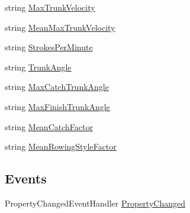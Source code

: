 \begin{DoxyCompactItemize}
string \hyperlink{class_rowing_monitor_1_1_view_model_1_1_rowing_meta_data_view_model_a4a77b8f455bb2f7862d2a7b8317be240}{Max\+Trunk\+Velocity}
\item 
string \hyperlink{class_rowing_monitor_1_1_view_model_1_1_rowing_meta_data_view_model_ac3f9c7d2915d82a2dd52a5d2cde6bdf6}{Mean\+Max\+Trunk\+Velocity}
\item 
string \hyperlink{class_rowing_monitor_1_1_view_model_1_1_rowing_meta_data_view_model_a96c4ef2c2ec7317e1df269ea3bfb124a}{Strokes\+Per\+Minute}
\item 
string \hyperlink{class_rowing_monitor_1_1_view_model_1_1_rowing_meta_data_view_model_a90dbffdd98c1a1415d9d8b41d65684f2}{Trunk\+Angle}
\item 
string \hyperlink{class_rowing_monitor_1_1_view_model_1_1_rowing_meta_data_view_model_abaecd5e8f7ff65231b2ba9b8390baecb}{Max\+Catch\+Trunk\+Angle}
\item 
string \hyperlink{class_rowing_monitor_1_1_view_model_1_1_rowing_meta_data_view_model_a9ae268c1bb8e81d38974f8e81977682c}{Max\+Finish\+Trunk\+Angle}
\item 
string \hyperlink{class_rowing_monitor_1_1_view_model_1_1_rowing_meta_data_view_model_ae0051dc9d140b819243d2269a22a1a5e}{Mean\+Catch\+Factor}
\item 
string \hyperlink{class_rowing_monitor_1_1_view_model_1_1_rowing_meta_data_view_model_a1873631d333228f09de939087db24052}{Mean\+Rowing\+Style\+Factor}
\end{DoxyCompactItemize}
\subsection*{Events}
\begin{DoxyCompactItemize}
\item 
Property\+Changed\+Event\+Handler \hyperlink{class_rowing_monitor_1_1_view_model_1_1_rowing_meta_data_view_model_a54801af6236117dcc9e59b64d6e832ae}{Property\+Changed}
\end{DoxyCompactItemize}


